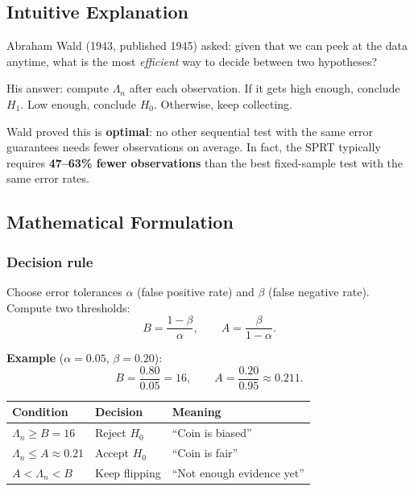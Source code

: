 \documentclass[12pt, a4paper]{article}
\newcommand{\LR}{\Lambda}              %
\begin{document}
\subsection{Intuitive Explanation}

\begin{intuition}
Abraham Wald (1943, published 1945) asked: given that we can peek at the data
anytime, what is the most \emph{efficient} way to decide between two
hypotheses?

His answer: compute $\LR_n$ after each observation.  If it gets high enough,
conclude $H_1$.  Low enough, conclude $H_0$.  Otherwise, keep collecting.

Wald proved this is \textbf{optimal}: no other sequential test with the same
error guarantees needs fewer observations on average.  In fact, the SPRT
typically requires \textbf{47--63\% fewer observations} than the best
fixed-sample test with the same error rates.
\end{intuition}

\subsection{Mathematical Formulation}

\subsubsection*{Decision rule}

Choose error tolerances $\alpha$ (false positive rate) and $\beta$ (false
negative rate).  Compute two thresholds:
\[
  \boxed{B = \frac{1-\beta}{\alpha}}, \qquad
  \boxed{A = \frac{\beta}{1-\alpha}}.
\]

\textbf{Example} ($\alpha = 0.05$, $\beta = 0.20$):
\[
  B = \frac{0.80}{0.05} = 16, \qquad
  A = \frac{0.20}{0.95} \approx 0.211.
\]

\begin{center}
\begin{tabular}{@{} l l l @{}}
\toprule
\textbf{Condition} & \textbf{Decision} & \textbf{Meaning} \\
\midrule
$\LR_n \geq B = 16$        & Reject $H_0$  & ``Coin is biased'' \\
$\LR_n \leq A \approx 0.21$  & Accept $H_0$  & ``Coin is fair'' \\
$A < \LR_n < B$            & Keep flipping & ``Not enough evidence yet'' \\
\bottomrule
\end{tabular}
\end{center}
\end{document}
